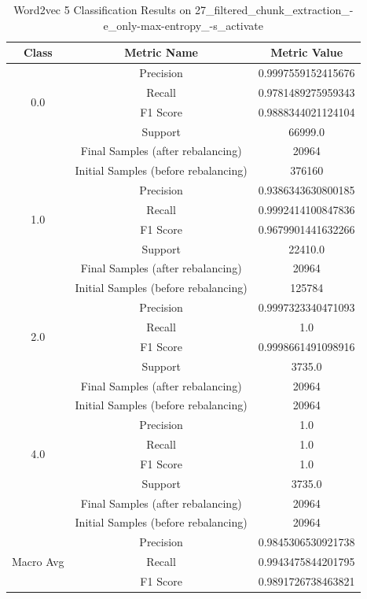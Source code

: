 \begin{longtable}{|c|c|c|}
\caption{Word2vec 5 Classification Results on 27\_filtered\_chunk\_extraction\_-e\_only-max-entropy\_-s\_activate} \label{tab:27_filtered_chunk_extraction_-e_only-max-entropy_-s_activate_word2vec_5_classifiers_results} \\
\hline
Class & Metric Name & Metric Value \\
\hline
\multirow{4}{*}{0.0} & Precision & 0.9997559152415676 \\
 & Recall & 0.9781489275959343 \\
 & F1 Score & 0.9888344021124104 \\
 & Support & 66999.0 \\
 & Final Samples (after rebalancing) & 20964 \\
 & Initial Samples (before rebalancing) & 376160 \\
\hline
\multirow{4}{*}{1.0} & Precision & 0.9386343630800185 \\
 & Recall & 0.9992414100847836 \\
 & F1 Score & 0.9679901441632266 \\
 & Support & 22410.0 \\
 & Final Samples (after rebalancing) & 20964 \\
 & Initial Samples (before rebalancing) & 125784 \\
\hline
\multirow{4}{*}{2.0} & Precision & 0.9997323340471093 \\
 & Recall & 1.0 \\
 & F1 Score & 0.9998661491098916 \\
 & Support & 3735.0 \\
 & Final Samples (after rebalancing) & 20964 \\
 & Initial Samples (before rebalancing) & 20964 \\
\hline
\multirow{4}{*}{4.0} & Precision & 1.0 \\
 & Recall & 1.0 \\
 & F1 Score & 1.0 \\
 & Support & 3735.0 \\
 & Final Samples (after rebalancing) & 20964 \\
 & Initial Samples (before rebalancing) & 20964 \\
\hline
\multirow{4}{*}{Macro Avg} & Precision & 0.9845306530921738 \\
 & Recall & 0.9943475844201795 \\
 & F1 Score & 0.9891726738463821 \\

\end{longtable}
